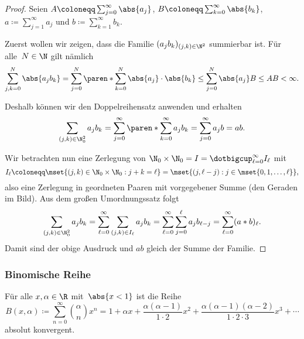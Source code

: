 \documentclass[a4paper]{article}
\begin{document}
\begin{proof}
    Seien $A \coloneqq \sum_{j=0}^\infty \abs{a_j}$, $B \coloneqq \sum_{k=0}^\infty \abs{b_k}$, $a \coloneqq \sum_{j=1}^\infty a_j$ und $b \coloneqq \sum_{k=1}^\infty b_k$.

    Zuerst wollen wir zeigen, dass die Familie $(a_jb_k)_{(j,k)\in\N^2}$ summierbar ist. Für alle~$N \in \N$ gilt nämlich
    \begin{equation*}
        \sum_{j,k=0}^N \abs{a_jb_k} = \sum_{j=0}^N \paren*{\sum_{k=0}^N \abs{a_j}\cdot\abs{b_k}} \leq \sum_{j=0}^N \abs{a_j} B \leq AB < \infty.
    \end{equation*}

    Deshalb können wir den Doppelreihensatz anwenden und erhalten
    \begin{equation*}
        \sum_{(j,k) \in \N_0^2} a_jb_k = \sum_{j=0}^\infty \paren*{\sum_{k=0}^\infty a_jb_k} = \sum_{j=0}^\infty a_jb = ab.
    \end{equation*}

    Wir betrachten nun eine Zerlegung von $\N_0\times\N_0 = I = \dotbigcup_{\ell=0}^\infty I_\ell$ mit
    \begin{equation*}
        I_\ell \coloneqq \mset{(j,k) \in \N_0\times\N_0 : j+k=\ell} = \mset{(j,\ell-j) : j \in \mset{0, 1,\dots,\ell}},
    \end{equation*}
    also eine Zerlegung in geordneten Paaren mit vorgegebener Summe (den Geraden im Bild). Aus dem großen Umordnungssatz folgt
    \begin{equation*}
        \sum_{(j,k) \in \N_0^2} a_jb_k = \sum_{\ell=0}^\infty \sum_{(j,k)\in I_\ell} a_jb_k = \sum_{\ell=0}^\infty \sum_{j=0}^\ell a_jb_{\ell-j} = \sum_{\ell=0}^\infty (a*b)_{\ell}.
    \end{equation*}
    Damit sind der obige Ausdruck und $ab$ gleich der Summe der Familie.
\end{proof}

\subsubsection{Binomische Reihe}

\begin{theorem}
    Für alle $x,\alpha \in \R$ mit~$\abs{x < 1}$ ist die Reihe
    \begin{equation*}
        B(x,\alpha) \coloneqq \sum_{n=0}^\infty \binom{\alpha}{n} x^n = 1 + \alpha x + \frac{\alpha(\alpha-1)}{1\cdot2} x^2 + \frac{\alpha(\alpha-1)(\alpha-2)}{1\cdot2\cdot3} x^3 + \cdots
    \end{equation*}
    absolut konvergent.
\end{theorem}
\end{document}
